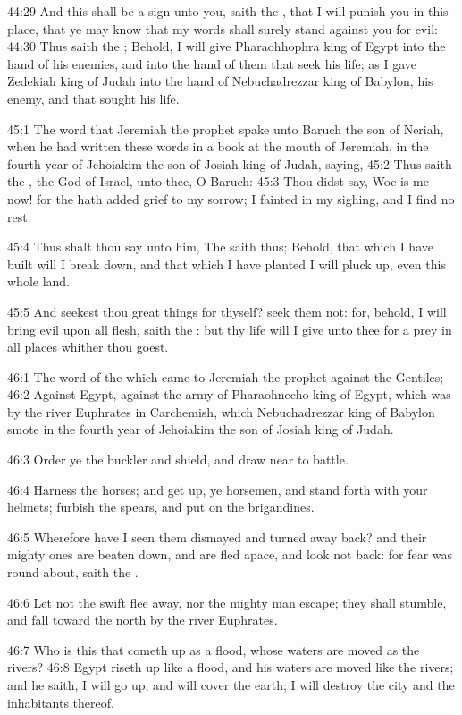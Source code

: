 44:29 And this shall be a sign unto you, saith the \LORD, that I will punish you in this place, that ye may know that my words shall surely stand against you for evil: 44:30 Thus saith the \LORD; Behold, I will give Pharaohhophra king of Egypt into the hand of his enemies, and into the hand of them that seek his life; as I gave Zedekiah king of Judah into the hand of Nebuchadrezzar king of Babylon, his enemy, and that sought his life.

45:1 The word that Jeremiah the prophet spake unto Baruch the son of Neriah, when he had written these words in a book at the mouth of Jeremiah, in the fourth year of Jehoiakim the son of Josiah king of Judah, saying, 45:2 Thus saith the \LORD, the God of Israel, unto thee, O Baruch: 45:3 Thou didst say, Woe is me now! for the \LORD hath added grief to my sorrow; I fainted in my sighing, and I find no rest.

45:4 Thus shalt thou say unto him, The \LORD saith thus; Behold, that which I have built will I break down, and that which I have planted I will pluck up, even this whole land.

45:5 And seekest thou great things for thyself? seek them not: for, behold, I will bring evil upon all flesh, saith the \LORD: but thy life will I give unto thee for a prey in all places whither thou goest.

46:1 The word of the \LORD which came to Jeremiah the prophet against the Gentiles; 46:2 Against Egypt, against the army of Pharaohnecho king of Egypt, which was by the river Euphrates in Carchemish, which Nebuchadrezzar king of Babylon smote in the fourth year of Jehoiakim the son of Josiah king of Judah.

46:3 Order ye the buckler and shield, and draw near to battle.

46:4 Harness the horses; and get up, ye horsemen, and stand forth with your helmets; furbish the spears, and put on the brigandines.

46:5 Wherefore have I seen them dismayed and turned away back? and their mighty ones are beaten down, and are fled apace, and look not back: for fear was round about, saith the \LORD.

46:6 Let not the swift flee away, nor the mighty man escape; they shall stumble, and fall toward the north by the river Euphrates.

46:7 Who is this that cometh up as a flood, whose waters are moved as the rivers?  46:8 Egypt riseth up like a flood, and his waters are moved like the rivers; and he saith, I will go up, and will cover the earth; I will destroy the city and the inhabitants thereof.

